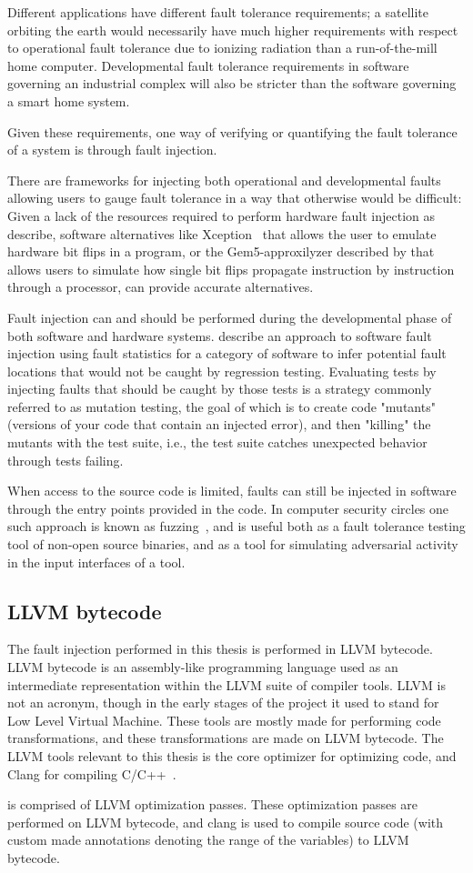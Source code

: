 Different applications have different fault tolerance requirements; a satellite orbiting the earth would necessarily have much higher requirements with respect to operational fault tolerance due to ionizing radiation than a run-of-the-mill home computer. Developmental fault tolerance requirements in software governing an industrial complex will also be stricter than the software governing a smart home system. 

Given these requirements, one way of verifying or quantifying the fault tolerance of a system is through fault injection.

There are frameworks for injecting both operational and developmental faults allowing users to gauge fault tolerance in a way that otherwise would be difficult: Given a lack of the resources required to perform hardware fault injection as \citet{arlat1993fault} describe, software alternatives like Xception~\citep{carreira1998xception} that allows the user to emulate hardware bit flips in a program, or the Gem5-approxilyzer described by \citet{venkatagiri2019gem5} that allows users to simulate how single bit flips propagate instruction by instruction through a processor, can provide accurate alternatives.

Fault injection can and should be performed during the developmental phase of both software and hardware systems. \citet{natella2012fault} describe an approach to software fault injection using fault statistics for a category of software to infer potential fault locations that would not be caught by regression testing. Evaluating tests by injecting faults that should be caught by those tests is a strategy commonly referred to as mutation testing, the goal of which is to create code "mutants" (versions of your code that contain an injected error), and then "killing" the mutants with the test suite, i.e.,  the test suite catches unexpected behavior through tests failing.

When access to the source code is limited, faults can still be injected in software through the entry points provided in the code. In computer security circles one such approach is known as fuzzing~\citep{miller1990empirical}, and is useful both as a fault tolerance testing tool of non-open source binaries, and as a tool for simulating adversarial activity in the input interfaces of a tool.

\subsection{LLVM bytecode}
The fault injection performed in this thesis is performed in LLVM bytecode.
LLVM bytecode is an assembly-like programming language used as an intermediate representation within the LLVM suite of compiler tools. LLVM is not an acronym, though in the early stages of the project it used to stand for Low Level Virtual Machine. These tools are mostly made for performing code transformations, and these transformations are made on LLVM bytecode. The LLVM tools relevant to this thesis is the core optimizer for optimizing code, and Clang for compiling C/C++~\citep{LLVM_homepage}.  %

\taffo{} is comprised of LLVM optimization passes. These optimization passes are performed on LLVM bytecode, and clang is used to compile source code (with custom made annotations denoting the range of the variables) to LLVM bytecode. %

